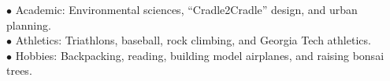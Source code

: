 \documentclass[12pt]{cv}
\begin{document}
\begin{llist}

$\bullet$ Academic: Environmental sciences, ``Cradle2Cradle'' design, and urban planning.\\
$\bullet$ Athletics: Triathlons, baseball, rock climbing, and Georgia Tech athletics.\\
$\bullet$ Hobbies: Backpacking, reading, building model airplanes, and raising bonsai trees.\\

\end{llist}
\end{document}
